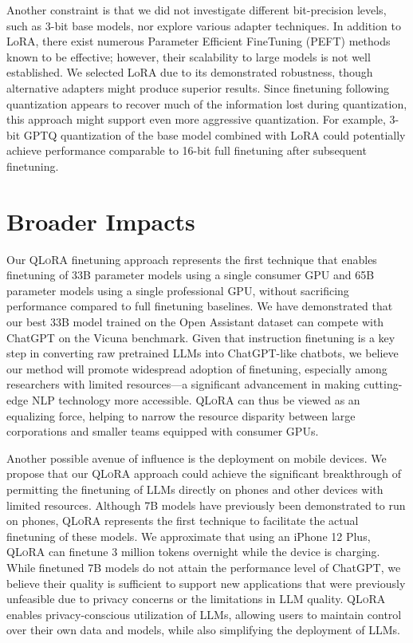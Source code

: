 Another constraint is that we did not investigate different bit-precision levels, such as 3-bit base models, nor explore various adapter techniques. In addition to LoRA, there exist numerous Parameter Efficient FineTuning (PEFT) methods known to be effective; however, their scalability to large models is not well established. We selected LoRA due to its demonstrated robustness, though alternative adapters might produce superior results. Since finetuning following quantization appears to recover much of the information lost during quantization, this approach might support even more aggressive quantization. For example, 3-bit GPTQ quantization of the base model combined with LoRA could potentially achieve performance comparable to 16-bit full finetuning after subsequent finetuning.

\section{Broader Impacts}

Our \textsc{QLoRA} finetuning approach represents the first technique that enables finetuning of 33B parameter models using a single consumer GPU and 65B parameter models using a single professional GPU, without sacrificing performance compared to full finetuning baselines. We have demonstrated that our best 33B model trained on the Open Assistant dataset can compete with ChatGPT on the Vicuna benchmark. Given that instruction finetuning is a key step in converting raw pretrained LLMs into ChatGPT-like chatbots, we believe our method will promote widespread adoption of finetuning, especially among researchers with limited resources—a significant advancement in making cutting-edge NLP technology more accessible. \textsc{QLoRA} can thus be viewed as an equalizing force, helping to narrow the resource disparity between large corporations and smaller teams equipped with consumer GPUs.

Another possible avenue of influence is the deployment on mobile devices. We propose that our \textsc{QLoRA} approach could achieve the significant breakthrough of permitting the finetuning of LLMs directly on phones and other devices with limited resources. Although 7B models have previously been demonstrated to run on phones, \textsc{QLoRA} represents the first technique to facilitate the actual finetuning of these models. We approximate that using an iPhone 12 Plus, \textsc{QLoRA} can finetune 3 million tokens overnight while the device is charging. While finetuned 7B models do not attain the performance level of ChatGPT, we believe their quality is sufficient to support new applications that were previously unfeasible due to privacy concerns or the limitations in LLM quality. \textsc{QLoRA} enables privacy-conscious utilization of LLMs, allowing users to maintain control over their own data and models, while also simplifying the deployment of LLMs.

